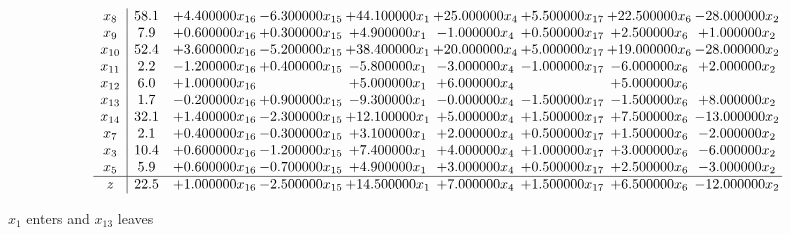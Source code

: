 \documentclass[10pt]{article}
\begin{document}
 \[\begin{array}{c| c c@{\hskip 2pt} c@{\hskip 2pt} c@{\hskip 2pt} c@{\hskip 2pt} c@{\hskip 2pt} c@{\hskip 2pt} c@{\hskip 2pt} }
 x_{8}   &  58.1 & + 4.400000 x_{16} & -6.300000 x_{15} & + 44.100000 x_{1} & + 25.000000 x_{4} & + 5.500000 x_{17} & + 22.500000 x_{6} & -28.000000 x_{2}\\
 x_{9}   &  7.9 & + 0.600000 x_{16} & + 0.300000 x_{15} & + 4.900000 x_{1} & -1.000000 x_{4} & + 0.500000 x_{17} & + 2.500000 x_{6} & + 1.000000 x_{2}\\
 x_{10}   &  52.4 & + 3.600000 x_{16} & -5.200000 x_{15} & + 38.400000 x_{1} & + 20.000000 x_{4} & + 5.000000 x_{17} & + 19.000000 x_{6} & -28.000000 x_{2}\\
 x_{11}   &  2.2 & -1.200000 x_{16} & + 0.400000 x_{15} & -5.800000 x_{1} & -3.000000 x_{4} & -1.000000 x_{17} & -6.000000 x_{6} & + 2.000000 x_{2}\\
 x_{12}   &  6.0 & + 1.000000 x_{16} &   & + 5.000000 x_{1} & + 6.000000 x_{4} &   & + 5.000000 x_{6} &   \\
 x_{13}   &  1.7 & -0.200000 x_{16} & + 0.900000 x_{15} & -9.300000 x_{1} & -0.000000 x_{4} & -1.500000 x_{17} & -1.500000 x_{6} & + 8.000000 x_{2}\\
 x_{14}   &  32.1 & + 1.400000 x_{16} & -2.300000 x_{15} & + 12.100000 x_{1} & + 5.000000 x_{4} & + 1.500000 x_{17} & + 7.500000 x_{6} & -13.000000 x_{2}\\
 x_{7}   &  2.1 & + 0.400000 x_{16} & -0.300000 x_{15} & + 3.100000 x_{1} & + 2.000000 x_{4} & + 0.500000 x_{17} & + 1.500000 x_{6} & -2.000000 x_{2}\\
 x_{3}   &  10.4 & + 0.600000 x_{16} & -1.200000 x_{15} & + 7.400000 x_{1} & + 4.000000 x_{4} & + 1.000000 x_{17} & + 3.000000 x_{6} & -6.000000 x_{2}\\
 x_{5}   &  5.9 & + 0.600000 x_{16} & -0.700000 x_{15} & + 4.900000 x_{1} & + 3.000000 x_{4} & + 0.500000 x_{17} & + 2.500000 x_{6} & -3.000000 x_{2}\\
\hline
z    &  22.5 & + 1.000000 x_{16} & -2.500000 x_{15} & + 14.500000 x_{1} & + 7.000000 x_{4} & + 1.500000 x_{17} & + 6.500000 x_{6} & -12.000000 x_{2}\\
\end{array}\]


 $ x_{1} $ enters and $ x_{13} $ leaves 
\end{document}
